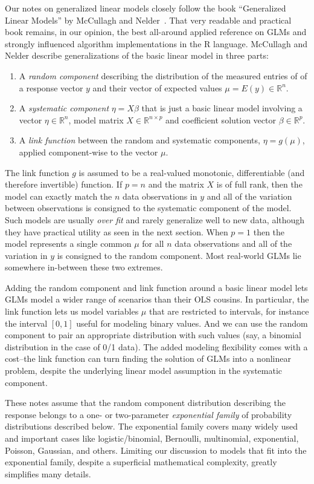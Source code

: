 \documentclass[10pt]{article} %
\newcommand{\R}{{\mathbb R}}
\begin{document}
Our notes on generalized linear models closely follow the book
``Generalized Linear Models'' by McCullagh and Nelder~\cite{MN}.  That very
readable and practical book remains, in our opinion, the best all-around applied
reference on GLMs and strongly influenced algorithm implementations in the
R language.
McCullagh and Nelder describe generalizations of the basic linear model
in three parts:
\begin{enumerate}
\item A \emph{random component} describing the distribution of the
measured entries of of a response vector $y$ and their vector of
expected values $\mu = E(y)\in\R^n$.
\item A \emph{systematic component} $\eta = X\beta$ that is just a basic
linear model involving a vector $\eta\in\R^n$, model matrix $X\in\R^{n\times p}$ and
coefficient solution vector $\beta\in\R^p$.
\item A \emph{link function} between the random and systematic components,
$\eta = g(\mu)$, applied component-wise to the vector $\mu$.
\end{enumerate}
The link function $g$ is assumed to be a real-valued monotonic, differentiable
(and therefore invertible) function. If $p=n$ and the matrix $X$ is of full
rank, then the model can exactly match the $n$ data observations in $y$ and all
of the variation between observations is consigned to the systematic component
of the model. Such models are usually \emph{over fit} and rarely generalize
well to new data, although they have practical utility as seen in the next
section. When $p=1$ then the model represents a single common $\mu$
for all $n$ data observations and all of the variation in $y$ is
consigned to the random component. Most real-world GLMs lie somewhere
in-between these two extremes.


Adding the random component and link function around a basic linear model
lets GLMs model a wider range of scenarios than their OLS cousins. In
particular, the link function lets us model variables $\mu$ that are restricted
to intervals, for instance the interval $[0,1]$ useful for modeling binary
values.  And we can use the random component to pair an appropriate
distribution with such values (say, a binomial distribution in the case of 0/1
data). The added modeling flexibility comes with a cost--the link function can
turn finding the solution of GLMs into a nonlinear problem, despite the
underlying linear model assumption in the systematic component.


These notes assume that the random component distribution describing the
response belongs to a one- or two-parameter \emph{exponential family} of
probability distributions described below. The exponential family covers many
widely used and important cases like logistic/binomial, Bernoulli, multinomial,
exponential, Poisson, Gaussian, and others. Limiting our discussion to models
that fit into the exponential family, despite a superficial mathematical
complexity, greatly simplifies many details.
\end{document}
